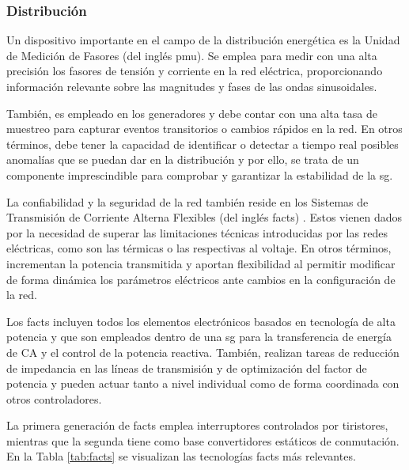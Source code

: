 \vspace{3mm}

\subsubsection{Distribución}

Un dispositivo importante en el campo de la distribución energética es la Unidad de Medición de Fasores (del inglés \gls{pmu}). Se emplea para medir con una alta precisión los fasores de tensión y corriente en la red eléctrica, proporcionando información relevante sobre las magnitudes y fases de las ondas sinusoidales. 

\vspace{3mm}

También, es empleado en los generadores y debe contar con una alta tasa de muestreo para capturar eventos transitorios o cambios rápidos en la red. En otros términos, debe tener la capacidad de identificar o detectar a tiempo real posibles anomalías que se puedan dar en la distribución y por ello, se trata de un componente imprescindible para comprobar y garantizar la estabilidad de la \gls{sg}. %

\vspace{3mm}

La confiabilidad y la seguridad de la red también reside en los Sistemas de Transmisión de Corriente Alterna Flexibles (del inglés \gls{facts}) \cite{facts} \cite{facts3}. Estos vienen dados por la necesidad de superar las limitaciones técnicas introducidas por las redes eléctricas, como son las térmicas o las respectivas al voltaje. En otros términos, incrementan la potencia transmitida y aportan flexibilidad al permitir modificar de forma dinámica los parámetros eléctricos ante cambios en la configuración de la red. 

\vspace{3mm}

Los \gls{facts} incluyen todos los elementos electrónicos basados en tecnología de alta potencia y que son empleados dentro de una \gls{sg} para la transferencia de energía de CA y el control de la potencia reactiva. También, realizan tareas de reducción de impedancia en las líneas de transmisión y de optimización del factor de potencia y pueden actuar tanto a nivel individual como de forma coordinada con otros controladores.

\vspace{3mm}

La primera generación de \gls{facts} emplea interruptores controlados por tiristores, mientras que la segunda tiene como base convertidores estáticos de conmutación. En la Tabla \ref{tab:facts} se visualizan las tecnologías \gls{facts} más relevantes. \cite{facts2} \cite{facts3}

